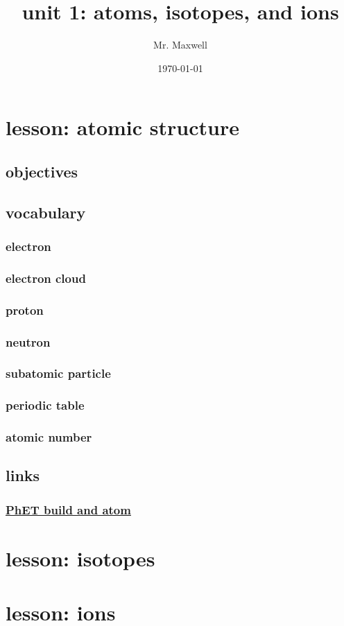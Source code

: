\documentclass[11pt]{article}
\author{Mr. Maxwell}
\date{\today}
\title{unit 1: atoms, isotopes, and ions}
\begin{document}
\maketitle
\tableofcontents


\section{lesson: atomic structure}
\label{sec:orgee94e52}
\subsection{objectives}
\label{sec:org6e0113f}
\subsection{vocabulary}
\label{sec:org8ac196e}
\subsubsection{electron}
\label{sec:orgaf8a0ce}
\subsubsection{electron cloud}
\label{sec:org675e9cb}
\subsubsection{proton}
\label{sec:org67af8f2}
\subsubsection{neutron}
\label{sec:orgfade568}
\subsubsection{subatomic particle}
\label{sec:org642f8f8}
\subsubsection{periodic table}
\label{sec:org6ce773c}
\subsubsection{atomic number}
\label{sec:org98b76f1}
\subsection{links}
\label{sec:org86a00f8}
\subsubsection{\href{https://phet.colorado.edu/sims/html/build-an-atom/latest/build-an-atom\_all.html}{PhET build and atom}}
\label{sec:orgfa4565e}
\section{lesson: isotopes}
\label{sec:org5c7ac0d}
\section{lesson: ions}
\label{sec:org9ff4771}


\vspace{2cm}

  \par
\end{document}
